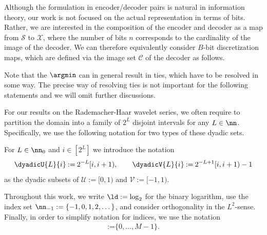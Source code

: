 \documentclass[twoside,11pt]{article}
\newcommand{\defeq}{\mathbin{:=}}
\newcommand{\fSpace}[1]{\ensuremath{\mathcal{#1}}}
\newcommand{\set}[1]{\ensuremath{\mathcal{#1}}}
\begin{document}
Although the formulation in encoder/decoder pairs is natural in information theory, our work is not focused on the actual representation in terms of bits.
Rather, we are interested in the composition of the encoder and decoder as a map from $\set{S}$ to $\fSpace{X}$, where the number of bits $n$ corresponds to the cardinality of the image of the decoder.
We can therefore equivalently consider $B$-bit discretization maps, which are defined via the image set $\set{C}$ of the decoder as follows.
Note that the $\argmin$ can in general result in ties, which have to be resolved in some way.
The precise way of resolving ties is not important for the following statements and we will omit further discussions.

For our results on the Rademacher-Haar wavelet series, we often require to partition the domain into a family of $2^L$ disjoint intervals for any $L\in\nn$.
Specifically, we use the following notation for two types of these dyadic sets.
\begin{definition}
    For $L\in\nn_0$ and $i\in[2^L]$ we introduce the notation
    \begin{align}
        \dyadicU{L}{i}\defeq 2^{-L}[i,i+1),\qquad
        \dyadicV{L}{i}\defeq 2^{-L+1}[i,i+1)-1
    \end{align}
    as the dyadic subsets of $\set{U}\defeq[0,1)$ and $\set{V}\defeq[-1,1)$.
\end{definition}
Throughout this work, we write $\ld := \log_2$ for the binary logarithm, use the index set $\nn_{-1}:= \{-1, 0, 1, 2, \dots\}$, and consider orthogonality in the $L^2$-sense.
Finally, in order to simplify notation for indices, we use the notation
\begin{align}
    [M]\defeq \{0,\ldots,M-1\}.
\end{align}
\end{document}
